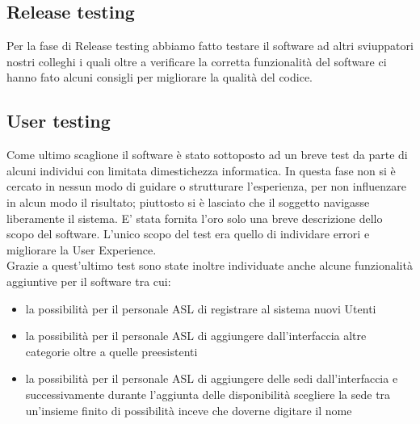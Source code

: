 \documentclass[a4paper,12pt,openany,oneside]{book}
\begin{document}
\subsection{Release testing}
Per la fase di Release testing abbiamo fatto testare il software ad altri sviuppatori nostri colleghi i quali oltre a verificare la corretta funzionalità del software ci hanno fato alcuni consigli per migliorare la qualità del codice.\\
\subsection{User testing}
Come ultimo scaglione il software è stato sottoposto ad un breve test da parte di alcuni individui con limitata dimestichezza informatica. In questa fase non si è cercato in nessun modo di guidare o strutturare l’esperienza, per non influenzare in alcun modo il risultato; piuttosto si è lasciato che il soggetto navigasse liberamente il sistema. E' stata fornita l'oro solo una breve descrizione dello scopo del software. L'unico scopo del test era quello di individare errori e migliorare la User Experience.\\
Grazie a quest'ultimo test sono state inoltre individuate anche alcune funzionalità aggiuntive per il software tra cui:
\begin{itemize}
\item la possibilità per il personale ASL di registrare al sistema nuovi Utenti
\item la possibilità per il personale ASL di aggiungere dall'interfaccia altre categorie oltre a quelle preesistenti
\item la possibilità per il personale ASL di aggiungere delle sedi dall'interfaccia e successivamente durante l'aggiunta delle disponibilità scegliere la sede tra un'insieme finito di possibilità inceve che doverne digitare il nome
\end{itemize}
\newpage
\end{document}
